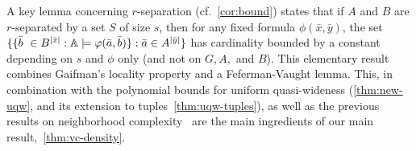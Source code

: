 A key lemma concerning $r$-separation (cf.~\cref{cor:bound}) states that if $A$
and $B$ are $r$-separated by a set $S$ of size $s$,
then for any fixed formula $\phi(\bar x,\bar y)$,
the set  $\{\{\bar{b}\ \in B^{|\bar x|} : \mathbb{A}\models\varphi(\bar{a},\bar{b})\} : \bar{a}\in A^{|\bar y|}\}$ has cardinality bounded by a constant depending on $s$ and $\phi$ only (and not on $G,A,$ and $B$). This elementary result combines  Gaifman's locality property and a Feferman-Vaught lemma. This, in combination with the polynomial bounds 
for uniform quasi-wideness (\cref{thm:new-uqw}, and its extension to tuples~\cref{thm:uqw-tuples}), as well as the previous results on neighborhood complexity~\cite{eickmeyer2016neighborhood,DrangeDFKLPPRVS16} are the main ingredients of our main result,~\cref{thm:vc-density}.

%
%
%
%
